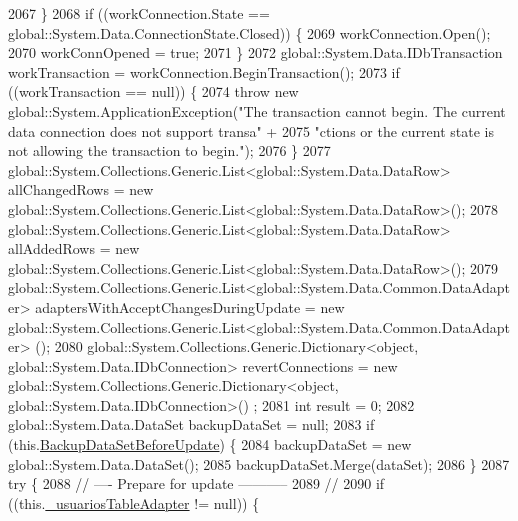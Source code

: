 \begin{DoxyCode}
2067             \}
2068             \textcolor{keywordflow}{if} ((workConnection.State == global::System.Data.ConnectionState.Closed)) \{
2069                 workConnection.Open();
2070                 workConnOpened = \textcolor{keyword}{true};
2071             \}
2072             global::System.Data.IDbTransaction workTransaction = workConnection.BeginTransaction();
2073             \textcolor{keywordflow}{if} ((workTransaction == null)) \{
2074                 \textcolor{keywordflow}{throw} \textcolor{keyword}{new} global::System.ApplicationException(\textcolor{stringliteral}{"The transaction cannot begin. The current
       data connection does not support transa"} +
2075                         \textcolor{stringliteral}{"ctions or the current state is not allowing the transaction to begin."});
2076             \}
2077             global::System.Collections.Generic.List<global::System.Data.DataRow> allChangedRows = \textcolor{keyword}{new} 
      global::System.Collections.Generic.List<global::System.Data.DataRow>();
2078             global::System.Collections.Generic.List<global::System.Data.DataRow> allAddedRows = \textcolor{keyword}{new} 
      global::System.Collections.Generic.List<global::System.Data.DataRow>();
2079             global::System.Collections.Generic.List<global::System.Data.Common.DataAdapter> 
      adaptersWithAcceptChangesDuringUpdate = \textcolor{keyword}{new} global::System.Collections.Generic.List<global::System.Data.Common.DataAdapter>
      ();
2080             global::System.Collections.Generic.Dictionary<object, global::System.Data.IDbConnection> 
      revertConnections = \textcolor{keyword}{new} global::System.Collections.Generic.Dictionary<object, global::System.Data.IDbConnection>()
      ;
2081             \textcolor{keywordtype}{int} result = 0;
2082             global::System.Data.DataSet backupDataSet = null;
2083             \textcolor{keywordflow}{if} (this.\hyperlink{class_proyecto___integrador__3_1_1ds_usuarios_table_adapters_1_1_table_adapter_manager_a289a0afd6e556f8088de0f56498e45d1}{BackupDataSetBeforeUpdate}) \{
2084                 backupDataSet = \textcolor{keyword}{new} global::System.Data.DataSet();
2085                 backupDataSet.Merge(dataSet);
2086             \}
2087             \textcolor{keywordflow}{try} \{
2088                 \textcolor{comment}{// ---- Prepare for update -----------}
2089                 \textcolor{comment}{//}
2090                 \textcolor{keywordflow}{if} ((this.\hyperlink{class_proyecto___integrador__3_1_1ds_usuarios_table_adapters_1_1_table_adapter_manager_abe0673c88efe0b34254112af02c6501c}{\_usuariosTableAdapter} != null)) \{

\end{DoxyCode}
